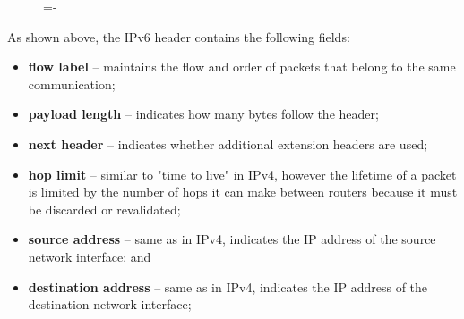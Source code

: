 \documentclass[a4paper]{systems-software}
\begin{document}
\begin{figure}[H]
	\lineskip=-\fboxrule
\end{figure}

As shown above, the IPv6 header contains the following fields:
\begin{itemize}
	\item \textbf{flow label} -- maintains the flow and order of packets that belong to the same communication;
	\item \textbf{payload length} -- indicates how many bytes follow the header;
	\item \textbf{next header} -- indicates whether additional extension headers are used;
	\item \textbf{hop limit} -- similar to "time to live" in IPv4, however the lifetime of a packet is limited by the number of hops it can make between routers because it must be discarded or revalidated;
	\item \textbf{source address} -- same as in IPv4, indicates the IP address of the source network interface; and
	\item \textbf{destination address} -- same as in IPv4, indicates the IP address of the destination network interface;
\end{itemize}
\end{document}
